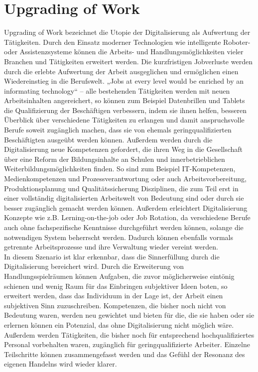 \section{Upgrading of Work}
Upgrading of Work bezeichnet die Utopie der Digitalisierung als Aufwertung der Tätigkeiten. Durch den Einsatz moderner Technologien wie intelligente Roboter- oder Assistenzsysteme können die Arbeits- und Handlungsmöglichkeiten vieler Branchen und Tätigkeiten erweitert werden. Die kurzfristigen Jobverluste werden durch die erlebte Aufwertung der Arbeit ausgeglichen und ermöglichen einen Wiedereinstieg in die Berufswelt. „Jobs at every level would be enriched by an informating technology“ – alle bestehenden Tätigkeiten werden mit neuen Arbeitsinhalten angereichert, so können zum Beispiel Datenbrillen und Tablets die Qualifizierung der Beschäftigen verbessern, indem sie ihnen helfen, besseren Überblick über verschiedene Tätigkeiten zu erlangen und damit anspruchsvolle Berufe soweit zugänglich machen, dass sie von ehemals geringqualifizierten Beschäftigten ausgeübt werden können. Außerdem werden durch die Digitalisierung neue Kompetenzen gefordert, die ihren Weg in die Gesellschaft über eine Reform der Bildungsinhalte an Schulen und innerbetrieblichen Weiterbildungsmöglichkeiten finden. So sind zum Beispiel IT-Kompetenzen, Medienkompetenzen und Prozessverantwortung oder auch Arbeitsvorbereitung, Produktionsplanung und Qualitätssicherung Disziplinen, die zum Teil erst in einer vollständig digitalisierten Arbeitswelt von Bedeutung sind oder durch sie besser zugänglich gemacht werden können. Außerdem erleichtert Digitalisierung Konzepte wie z.B. Lerning-on-the-job oder Job Rotation, da verschiedene Berufe auch ohne fachspezifische Kenntnisse durchgeführt werden können, solange die notwendigen System beherrscht werden. Dadurch können ebenfalls vormals getrennte Arbeitsprozesse und ihre Verwaltung wieder vereint werden. \cite[S.183]{Eisenmann.2018}\\

In diesem Szenario ist klar erkennbar, dass die Sinnerfüllung durch die Digitalisierung bereichert wird. Durch die Erweiterung von Handlungsspielräumen können Aufgaben, die zuvor möglicherweise eintönig schienen und wenig Raum für das Einbringen subjektiver Ideen boten, so erweitert werden, dass das Individuum in der Lage ist, der Arbeit einen subjektiven Sinn zuzuschreiben. Kompetenzen, die bisher noch nicht von Bedeutung waren, werden neu gewichtet und bieten für die, die sie haben oder sie erlernen können ein Potenzial, das ohne Digitalisierung nicht möglich wäre. Außerdem werden Tätigkeiten, die bisher noch für entsprechend hochqualifiziertes Personal vorbehalten waren, zugänglich für geringqualifizierte Arbeiter. Einzelne Teilschritte können zusammengefasst werden und das Gefühl der Resonanz des eigenen Handelns wird wieder klarer.
